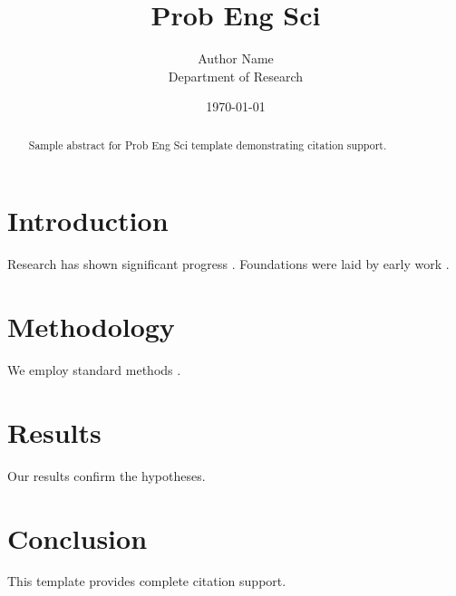 \documentclass{jfm}
\title{Prob Eng Sci}
\author{Author Name \\ \small Department of Research}
\date{\today}
\begin{document}
\maketitle

\begin{abstract}
Sample abstract for Prob Eng Sci template demonstrating citation support.
\end{abstract}

\section{Introduction}
Research has shown significant progress \citep{einstein1905}. Foundations were laid by early work \citep{turing1950}.

\section{Methodology}
We employ standard methods \citep{knuth1984}.

\section{Results}
Our results confirm the hypotheses.

\section{Conclusion}
This template provides complete citation support.



\end{document}
